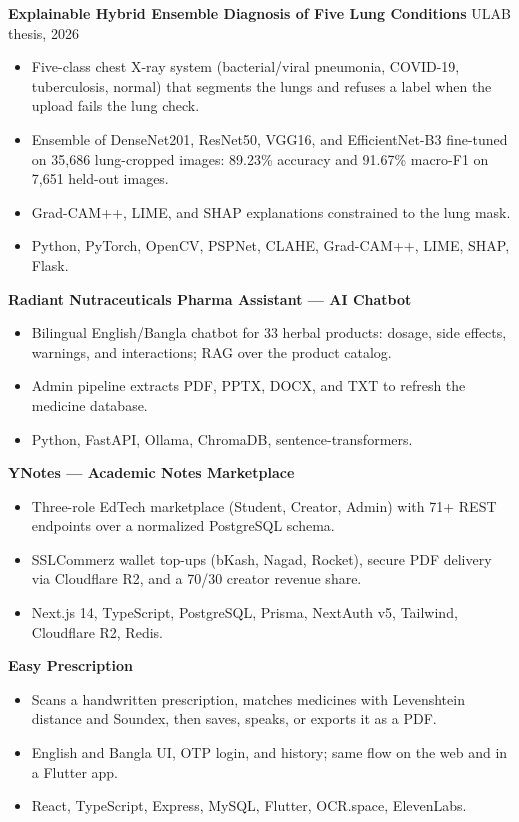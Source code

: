 \documentclass[letterpaper,11pt]{article}
\newcommand{\project}[2]{\vspace{3pt}\textbf{#1} \hfill #2 \\[-2pt]}
\begin{document}
\project{Explainable Hybrid Ensemble Diagnosis of Five Lung Conditions}{ULAB thesis, 2026}
\begin{itemize}[label=$\circ$]
    \item Five-class chest X-ray system (bacterial/viral pneumonia, COVID-19, tuberculosis, normal) that segments the lungs and refuses a label when the upload fails the lung check.
    \item Ensemble of DenseNet201, ResNet50, VGG16, and EfficientNet-B3 fine-tuned on 35,686 lung-cropped images: 89.23\% accuracy and 91.67\% macro-F1 on 7,651 held-out images.
    \item Grad-CAM++, LIME, and SHAP explanations constrained to the lung mask.
    \item Python, PyTorch, OpenCV, PSPNet, CLAHE, Grad-CAM++, LIME, SHAP, Flask.
\end{itemize}

\project{Radiant Nutraceuticals Pharma Assistant --- AI Chatbot}{}
\begin{itemize}[label=$\circ$]
    \item Bilingual English/Bangla chatbot for 33 herbal products: dosage, side effects, warnings, and interactions; RAG over the product catalog.
    \item Admin pipeline extracts PDF, PPTX, DOCX, and TXT to refresh the medicine database.
    \item Python, FastAPI, Ollama, ChromaDB, sentence-transformers.
\end{itemize}

\project{YNotes --- Academic Notes Marketplace}{}
\begin{itemize}[label=$\circ$]
    \item Three-role EdTech marketplace (Student, Creator, Admin) with 71+ REST endpoints over a normalized PostgreSQL schema.
    \item SSLCommerz wallet top-ups (bKash, Nagad, Rocket), secure PDF delivery via Cloudflare R2, and a 70/30 creator revenue share.
    \item Next.js 14, TypeScript, PostgreSQL, Prisma, NextAuth v5, Tailwind, Cloudflare R2, Redis.
\end{itemize}

\project{Easy Prescription}{}
\begin{itemize}[label=$\circ$]
    \item Scans a handwritten prescription, matches medicines with Levenshtein distance and Soundex, then saves, speaks, or exports it as a PDF.
    \item English and Bangla UI, OTP login, and history; same flow on the web and in a Flutter app.
    \item React, TypeScript, Express, MySQL, Flutter, OCR.space, ElevenLabs.
\end{itemize}
\end{document}
